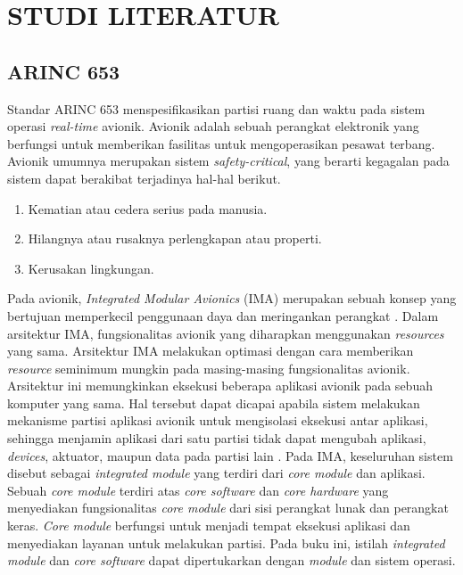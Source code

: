 \chapter{STUDI LITERATUR}

\section{ARINC 653}

Standar ARINC 653 menspesifikasikan partisi ruang dan waktu pada sistem operasi
\textit{real-time} avionik.  Avionik adalah sebuah perangkat elektronik yang berfungsi untuk
memberikan fasilitas untuk mengoperasikan pesawat terbang.  Avionik umumnya merupakan sistem
\textit{safety\hyp critical}, yang berarti kegagalan pada sistem dapat berakibat terjadinya
hal-hal berikut.

\begin{enumerate}

    \item Kematian atau cedera serius pada manusia.

    \item Hilangnya atau rusaknya perlengkapan atau properti.

    \item Kerusakan lingkungan.

\end{enumerate}

Pada avionik, \textit{Integrated Modular Avionics} (IMA) merupakan sebuah konsep yang bertujuan
memperkecil penggunaan daya dan meringankan perangkat \citep[p.~2.A.2-1]{Garside2009}.  Dalam
arsitektur IMA, fungsionalitas avionik yang diharapkan menggunakan \textit{resources} yang sama.
Arsitektur IMA melakukan optimasi dengan cara memberikan \textit{resource} seminimum mungkin
pada masing-masing fungsionalitas avionik.  Arsitektur ini memungkinkan eksekusi beberapa
aplikasi avionik pada sebuah komputer yang sama.  Hal tersebut dapat dicapai apabila sistem
melakukan mekanisme partisi aplikasi avionik untuk mengisolasi eksekusi antar aplikasi, sehingga
menjamin aplikasi dari satu partisi tidak dapat mengubah aplikasi, \textit{devices}, aktuator,
maupun data pada partisi lain \citep[pp.~11-12]{Rushby2000}.  Pada IMA, keseluruhan sistem
disebut sebagai \textit{integrated module} yang terdiri dari \textit{core module} dan aplikasi.
Sebuah \textit{core module} terdiri atas \textit{core software} dan \textit{core hardware} yang
menyediakan fungsionalitas \textit{core module} dari sisi perangkat lunak dan perangkat keras.
\textit{Core module} berfungsi untuk menjadi tempat eksekusi aplikasi dan menyediakan layanan
untuk melakukan partisi.  Pada buku ini, istilah \textit{integrated module} dan \textit{core
software} dapat dipertukarkan dengan \textit{module} dan sistem operasi.

